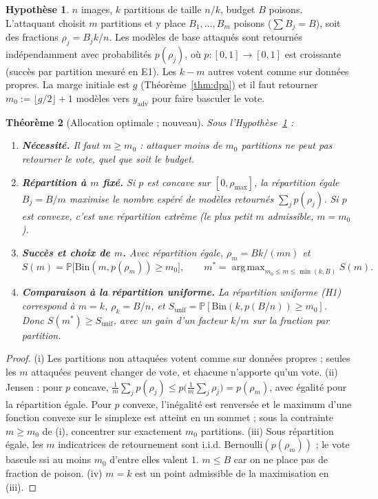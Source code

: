 \documentclass[11pt,a4paper]{article}
\theoremstyle{plain}
\newtheorem{theorem}{Théorème}[section]
\theoremstyle{definition}
\newtheorem{assumption}[theorem]{Hypothèse}
\theoremstyle{remark}
\newcommand{\Prob}{\mathbb{P}}
\newcommand{\yadv}{y_{\mathrm{adv}}}
\newcommand{\Bin}{\mathrm{Bin}}
\DeclareMathOperator{\argmax}{arg\,max}
\begin{document}
\begin{assumption}\label{ass:alloc}
$n$ images, $k$ partitions de taille $n/k$, budget $B$ poisons. L'attaquant choisit $m$ partitions
et y place $B_1,\dots,B_m$ poisons ($\sum B_j=B$), soit des fractions $\rho_j=B_jk/n$. Les modèles
de base attaqués sont retournés indépendamment avec probabilités $p(\rho_j)$, où $p:[0,1]\to[0,1]$
est croissante (succès par partition mesuré en E1). Les $k-m$ autres votent comme sur données
propres. La marge initiale est $g$ (Théorème~\ref{thm:dpa}) et il faut retourner
$m_0:=\lfloor g/2\rfloor+1$ modèles vers $\yadv$ pour faire basculer le vote.
\end{assumption}

\begin{theorem}[Allocation optimale ; nouveau]\label{thm:alloc}
Sous l'Hypothèse~\ref{ass:alloc} :
\begin{enumerate}[label=(\roman*)]
\item \textbf{Nécessité.} Il faut $m\ge m_0$ : attaquer moins de $m_0$ partitions ne peut pas
retourner le vote, quel que soit le budget.
\item \textbf{Répartition à $m$ fixé.} Si $p$ est concave sur $[0,\rho_{\max}]$, la répartition
égale $B_j=B/m$ maximise le nombre espéré de modèles retournés $\sum_jp(\rho_j)$. Si $p$ est
convexe, c'est une répartition extrême (le plus petit $m$ admissible, $m=m_0$).
\item \textbf{Succès et choix de $m$.} Avec répartition égale, $\rho_m=Bk/(mn)$ et
\[
S(m)=\Prob\big[\Bin(m,p(\rho_m))\ge m_0\big],\qquad m^*=\argmax_{m_0\le m\le\min(k,B)}S(m).
\]
\item \textbf{Comparaison à la répartition uniforme.} La répartition uniforme (H1) correspond à
$m=k$, $\rho_k=B/n$, et $S_{\mathrm{unif}}=\Prob[\Bin(k,p(B/n))\ge m_0]$. Donc
$S(m^*)\ge S_{\mathrm{unif}}$, avec un gain d'un facteur $k/m$ sur la fraction par partition.
\end{enumerate}
\end{theorem}
\begin{proof}
(i) Les partitions non attaquées votent comme sur données propres ; seules les $m$ attaquées
peuvent changer de vote, et chacune n'apporte qu'un vote. (ii) Jensen : pour $p$ concave,
$\frac1m\sum_jp(\rho_j)\le p\big(\frac1m\sum_j\rho_j\big)=p(\rho_m)$, avec égalité pour la
répartition égale. Pour $p$ convexe, l'inégalité est renversée et le maximum d'une fonction convexe
sur le simplexe est atteint en un sommet ; sous la contrainte $m\ge m_0$ de (i), concentrer sur
exactement $m_0$ partitions. (iii) Sous répartition égale, les $m$ indicatrices de retournement sont
i.i.d. Bernoulli$(p(\rho_m))$ ; le vote bascule ssi au moins $m_0$ d'entre elles valent $1$.
$m\le B$ car on ne place pas de fraction de poison. (iv) $m=k$ est un point admissible de la
maximisation en (iii).
\end{proof}
\end{document}
